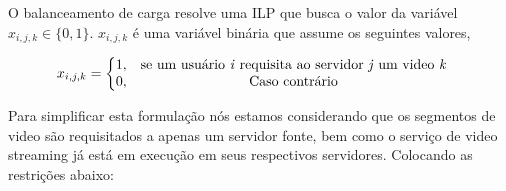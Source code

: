%
%
%
 
O balanceamento de carga resolve uma ILP que busca o valor da variável $x_{i,j,k} \in \{0, 1\}$. $x_{i,j,k}$ é uma variável binária que assume os seguintes valores,

\vspace{0.5cm}
\begin{equation}\label{total_capacity_loss}
x_{i,j,k} =
\left\{\begin{matrix}
1, & \text{se um usuário \textit{i} requisita ao servidor \textit{j} um video \textit{k}}& \\ 
0, & \text{Caso contrário} & 
\end{matrix}\right.
\end{equation}
\vspace{0.5cm}




Para simplificar esta formulação nós estamos considerando que os segmentos de video são requisitados a apenas um servidor fonte, bem como o serviço de video streaming já está em execução em seus respectivos servidores. Colocando as restrições abaixo:%


\vspace{0.5cm}

